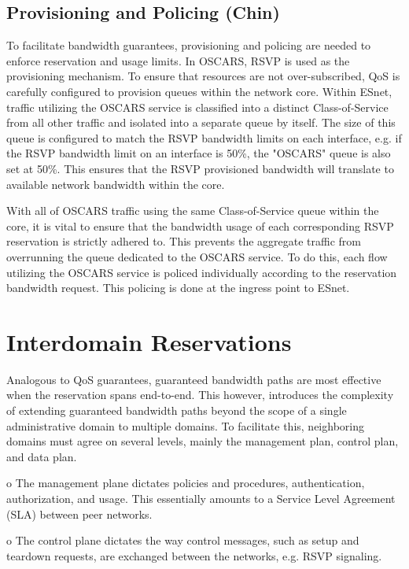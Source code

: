 \documentclass[conference]{IEEEtran}
\begin{document}
\subsection{Provisioning and Policing (Chin)}
To facilitate bandwidth guarantees, provisioning and policing are needed to 
enforce reservation and usage limits.  In OSCARS, RSVP is used as the 
provisioning mechanism.  To ensure that resources are not over-subscribed, QoS 
is carefully configured to provision queues within the network core.  Within 
ESnet, traffic utilizing the OSCARS service is classified into a distinct 
Class-of-Service from all other traffic and isolated into a separate queue by 
itself.  The size of this queue is configured to match the RSVP bandwidth 
limits on each interface, e.g. if the RSVP bandwidth limit on an interface is 
50\%, the "OSCARS" queue is also set at 50\%.  This ensures that the RSVP 
provisioned bandwidth will translate to available network bandwidth within 
the core.

With all of OSCARS traffic using the same Class-of-Service queue within the 
core, it is vital to ensure that the bandwidth usage of each corresponding 
RSVP reservation is strictly adhered to.  This prevents the aggregate traffic 
from overrunning the queue dedicated to the OSCARS service.  To do this, each 
flow utilizing the OSCARS service is policed individually according to the 
reservation bandwidth request.  This policing is done at the ingress point to 
ESnet.


\section{Interdomain Reservations}

Analogous to QoS guarantees, guaranteed bandwidth paths are most effective 
when the reservation spans end-to-end.  This however, introduces the 
complexity of extending guaranteed bandwidth paths beyond the scope of a 
single administrative domain to multiple domains.  To facilitate this, 
neighboring domains must agree on several levels, mainly the management plan, 
control plan, and data plan.

o The management plane dictates policies and procedures, authentication, 
authorization, and usage.  This essentially amounts to a Service Level 
Agreement (SLA) between peer networks.

o The control plane dictates the way control messages, such as setup and 
teardown requests, are exchanged between the networks, e.g. RSVP signaling.
\end{document}
